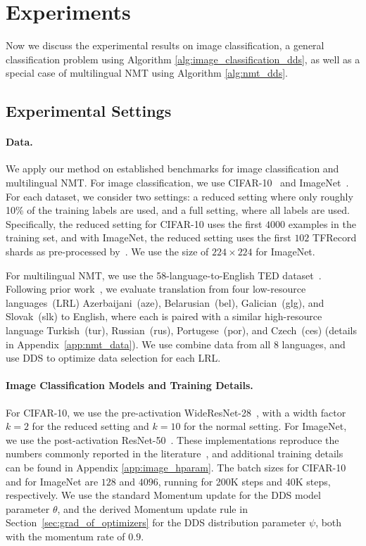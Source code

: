 \section{\label{sec:experiment}Experiments}
Now we discuss the experimental results on image classification, a general classification problem using Algorithm \ref{alg:image_classification_dds}, as well as a special case of multilingual NMT using Algorithm \ref{alg:nmt_dds}.

\subsection{\label{exp:settings}Experimental Settings}

\paragraph{Data.} We apply our method on established benchmarks for image classification and multilingual NMT.
For image classification, we use CIFAR-10~\citep{cifar10} and ImageNet~\citep{imagenet}. For each dataset, we consider two settings: a reduced setting where only roughly 10\% of the training labels are used, and a full setting, where all labels are used. Specifically, the reduced setting for CIFAR-10 uses the first $4000$ examples in the training set, and with ImageNet, the reduced setting uses the first $102$ TFRecord shards as pre-processed by~\citet{imagenet_generalize_better}. We use the size of $224 \times 224$ for ImageNet.

For multilingual NMT, we use the 58-language-to-English TED dataset~\citep{ted_pretrain_emb}. 
Following prior work~\citep{ted_pretrain_emb,rapid_adapt_nmt,SDE}, we evaluate translation from four low-resource languages~(LRL) Azerbaijani~(aze), Belarusian~(bel), Galician~(glg), and Slovak~(slk) to English, where each is paired with a similar high-resource language Turkish~(tur), Russian~(rus), Portugese~(por), and Czech~(ces) (details in Appendix~\ref{app:nmt_data}).
We use combine data from all 8 languages, and use DDS to optimize data selection for each LRL. 

\paragraph{Image Classification Models and Training Details.}
For CIFAR-10, we use the pre-activation WideResNet-28~\citep{wide_res_net}, with a width factor $k=2$ for the reduced setting and $k=10$ for the normal setting. For ImageNet, we use the post-activation ResNet-50~\citep{res_net}.
These implementations reproduce the numbers commonly reported in the literature~\citep{wide_res_net,res_net,resnext}, and additional training details can be found in Appendix \ref{app:image_hparam}.
The batch sizes for CIFAR-10 and for ImageNet are $128$ and $4096$, running for 200K steps and 40K steps, respectively. We use the standard Momentum update for the DDS model parameter $\theta$, and the derived Momentum update rule in Section~\ref{sec:grad_of_optimizers} for the DDS distribution parameter $\psi$, both with the momentum rate of $0.9$.

